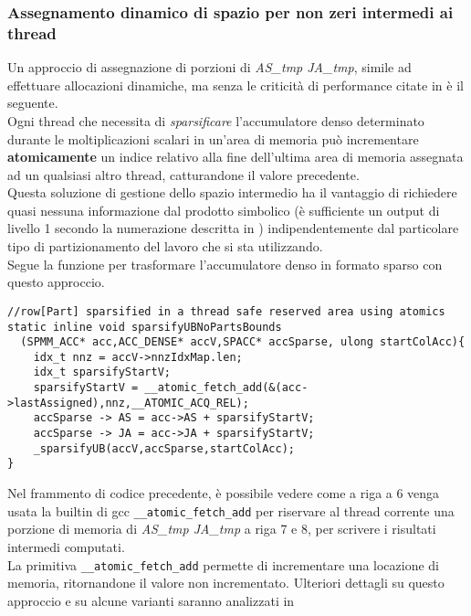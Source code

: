 \subsubsection[Assegnamento dinamico \\di spazio intermedio ai thread]
{Assegnamento dinamico di spazio per non zeri intermedi ai thread} \label{chSpMMNum:mallocReplaceAssigns}
Un approccio di assegnazione di porzioni di \emph{AS\_tmp JA\_tmp}, simile ad effettuare allocazioni 
dinamiche, ma senza le criticità di performance citate in 
è il seguente.\\
\label{chSpMMNum:sparsifyMallocReplace}
Ogni thread che necessita di \emph{sparsificare} l'accumulatore denso determinato durante 
le moltiplicazioni scalari in un'area di memoria può incrementare {\bf{atomicamente}} un 
indice relativo alla fine dell'ultima area di memoria assegnata ad un qualsiasi altro thread,
catturandone il valore precedente.\\
\label{chSpMMNum:sparsifyMallocReplace_EASY_INTEGRATION_IN_EVERY_UB_PARTITIONING}
Questa soluzione di gestione dello spazio intermedio ha il vantaggio di richiedere quasi
nessuna informazione dal prodotto simbolico (è sufficiente un output di livello 1 secondo la numerazione descritta in )
indipendentemente dal particolare tipo di partizionamento del lavoro che si sta utilizzando.\\
Segue la funzione per trasformare l'accumulatore denso in formato sparso con questo approccio.\\
\begin{lstlisting}
//row[Part] sparsified in a thread safe reserved area using atomics
static inline void sparsifyUBNoPartsBounds
  (SPMM_ACC* acc,ACC_DENSE* accV,SPACC* accSparse, ulong startColAcc){
    idx_t nnz = accV->nnzIdxMap.len;
    idx_t sparsifyStartV;
    sparsifyStartV = __atomic_fetch_add(&(acc->lastAssigned),nnz,__ATOMIC_ACQ_REL); 
    accSparse -> AS = acc->AS + sparsifyStartV;
    accSparse -> JA = acc->JA + sparsifyStartV;
    _sparsifyUB(accV,accSparse,startColAcc);
}
\end{lstlisting}
Nel frammento di codice precedente, è possibile vedere come a riga a 6 venga usata
la builtin di gcc \verb|__atomic_fetch_add| \cite{gcc10.1}
per riservare al thread corrente una porzione di memoria di \emph{AS\_tmp JA\_tmp}
a riga 7 e 8, per scrivere i risultati intermedi computati.\\
La primitiva \verb|__atomic_fetch_add| permette di incrementare una locazione 
di memoria, ritornandone il valore non incrementato.
Ulteriori dettagli su questo approccio e su alcune varianti saranno analizzati in 

